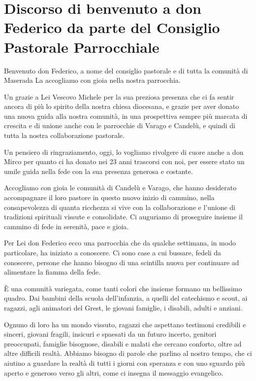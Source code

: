 \section{Discorso di benvenuto a don Federico da parte del Consiglio Pastorale Parrocchiale}

Benvenuto don Federico,
a nome del consiglio pastorale e di tutta la comunità di Maserada La accogliamo con gioia nella nostra parrocchia.

Un grazie a Lei Vescovo Michele per la sua preziosa presenza che ci fa sentir ancora di più lo spirito della nostra chiesa diocesana, e grazie per aver donato una nuova guida alla nostra comunità, in una prospettiva sempre più marcata di crescita e di unione anche con le parrocchie di Varago e Candelù, e quindi di tutta la nostra collaborazione pastorale.

Un pensiero di ringraziamento, oggi, lo vogliamo rivolgere di cuore anche a don Mirco per quanto ci ha donato nei 23 anni trascorsi con noi, per essere stato un umile guida nella fede con la sua presenza generosa e costante.

Accogliamo con gioia le comunità di Candelù e Varago, che hanno desiderato accompagnare il loro pastore in questo nuovo inizio di cammino, nella consapevolezza di quanta ricchezza si vive con la collaborazione e l’unione di tradizioni spirituali vissute e consolidate. Ci auguriamo di proseguire insieme il cammino di fede in serenità, pace e gioia.

Per Lei don Federico ecco una parrocchia che da qualche settimana, in modo particolare, ha iniziato a conoscere. Ci sono case a cui bussare, fedeli da conoscere, persone che hanno bisogno di una scintilla nuova per continuare ad alimentare la fiamma della fede. 

È una comunità variegata, come tanti colori che insieme formano un bellissimo quadro. Dai bambini della scuola dell’infanzia, a quelli del catechismo e scout, ai ragazzi, agli animatori del Grest, le giovani famiglie, i disabili, adulti e anziani. 

Ognuno di loro ha un mondo vissuto, ragazzi che aspettano testimoni credibili e sinceri, giovani fragili, insicuri e spaesati da un futuro incerto, genitori preoccupati, famiglie bisognose, disabili e malati che cercano conforto, oltre ad altre difficili realtà. Abbiamo bisogno di parole che parlino al nostro tempo, che ci aiutino a guardare la realtà di tutti i giorni con speranza e con uno sguardo più aperto e generoso verso gli altri, come ci insegna il messaggio evangelico. 

